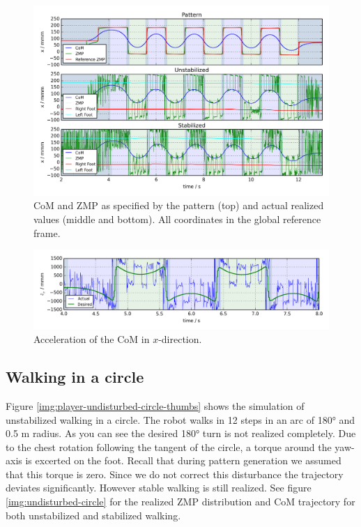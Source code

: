\documentclass[english,ngerman]{KITreprt}
\begin{document}
\begin{figure}[hbt]
\vspace*{-1em}
\includegraphics[width=\textwidth,resolution=300]{images/undisturbed_straight_x.png}
\caption{CoM and ZMP as specified by the pattern (top) and actual realized values (middle and bottom).
All coordinates in the global reference frame.}
\label{img:undisturbed-straight-x}
\end{figure}

\begin{figure}[hbt]
\vspace*{-1em}
\includegraphics[width=\textwidth,resolution=300]{images/noisy_com_acc.png}
\caption{Acceleration of the CoM in $x$-direction.}
\label{img:noisy-com-acc}
\end{figure}

\subsection{Walking in a circle}\label{walking-in-a-circle}

Figure \ref{img:player-undisturbed-circle-thumbs} shows the simulation
of unstabilized walking in a circle. The robot walks in 12 steps in an
arc of 180° and 0.5 m radius. As you can see the desired 180° turn is
not realized completely. Due to the chest rotation following the tangent
of the circle, a torque around the yaw-axis is excerted on the foot.
Recall that during pattern generation we assumed that this torque is
zero. Since we do not correct this disturbance the trajectory deviates
significantly. However stable walking is still realized. See figure
\ref{img:undisturbed-circle} for the realized ZMP distribution and CoM
trajectory for both unstabilized and stabilized walking.
\end{document}
